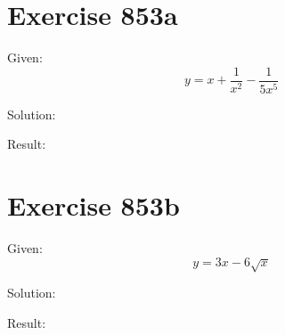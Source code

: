 \documentclass[a4paper, 10pt]{scrartcl}
\begin{document}
\section{Exercise 853a}

Given:
\[
y = x + \frac{1}{x^{2}} - \frac{1}{5x^{5}}
\]

Solution:

Result:

\section{Exercise 853b}

Given:
\[
y = 3x - 6\sqrt{x}
\]

Solution:

Result:
\end{document}
